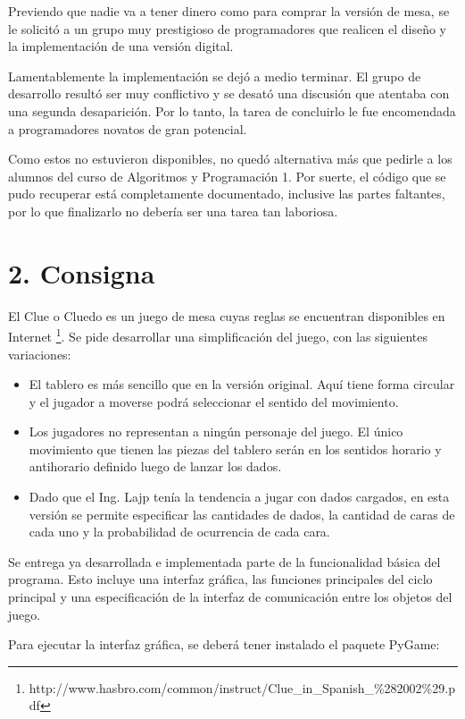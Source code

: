 \documentclass[12pt,spanish,]{article}
\begin{document}
Previendo que nadie va a tener dinero como para comprar la versión de
mesa, se le solicitó a un grupo muy prestigioso de programadores que
realicen el diseño y la implementación de una versión digital.

Lamentablemente la implementación se dejó a medio terminar. El grupo de
desarrollo resultó ser muy conflictivo y se desató una discusión que
atentaba con una segunda desaparición. Por lo tanto, la tarea de
concluirlo le fue encomendada a programadores novatos de gran potencial.

Como estos no estuvieron disponibles, no quedó alternativa más que
pedirle a los alumnos del curso de Algoritmos y Programación 1. Por
suerte, el código que se pudo recuperar está completamente documentado,
inclusive las partes faltantes, por lo que finalizarlo no debería ser
una tarea tan laboriosa.

\section{2. Consigna}\label{consigna}

El Clue o Cluedo es un juego de mesa cuyas reglas se encuentran
disponibles en Internet \footnote{http://www.hasbro.com/common/instruct/Clue\_in\_Spanish\_\%282002\%29.pdf}.
Se pide desarrollar una simplificación del juego, con las siguientes
variaciones:

\begin{itemize}
\item
  El tablero es más sencillo que en la versión original. Aquí tiene
  forma circular y el jugador a moverse podrá seleccionar el sentido del
  movimiento.
\item
  Los jugadores no representan a ningún personaje del juego. El único
  movimiento que tienen las piezas del tablero serán en los sentidos
  horario y antihorario definido luego de lanzar los dados.
\item
  Dado que el Ing. Lajp tenía la tendencia a jugar con dados cargados,
  en esta versión se permite especificar las cantidades de dados, la
  cantidad de caras de cada uno y la probabilidad de ocurrencia de cada
  cara.
\end{itemize}

Se entrega ya desarrollada e implementada parte de la funcionalidad
básica del programa. Esto incluye una interfaz gráfica, las funciones
principales del ciclo principal y una especificación de la interfaz de
comunicación entre los objetos del juego.

Para ejecutar la interfaz gráfica, se deberá tener instalado el paquete
PyGame:
\end{document}
